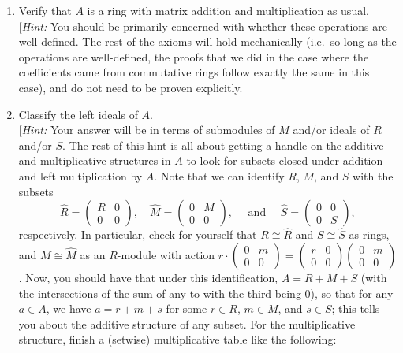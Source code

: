 \documentclass[11pt, reqno]{amsart}
\theoremstyle{plain}
\theoremstyle{definition}
\theoremstyle{example}
\begin{document}
\begin{enumerate}[1.]
\begin{enumerate}
\begin{enumerate}
\item Verify that $A$ is a ring with matrix addition and multiplication as usual. \\
{\small [\emph{Hint:} You should be primarily concerned with whether these operations are well-defined. The rest of the axioms will hold mechanically (i.e.\ so long as the operations are well-defined, the proofs that we did in the case where the coefficients came from commutative rings follow exactly the same in this case), and do not need to be proven explicitly.]}
\item Classify the left ideals of $A$. \\
{\small [\emph{Hint:} Your answer will be in terms of submodules of $M$ and/or ideals of $R$ and/or $S$. The rest of this hint is all about getting a handle on the additive and multiplicative structures in $A$ to look for subsets closed under addition and left multiplication by $A$. Note that we can identify $R$, $M$, and $S$ with the subsets 
$$\hat{R} =  \begin{pmatrix} R & 0 \\ 0 & 0 \end{pmatrix}, \quad \hat{M} = \begin{pmatrix} 0 & M \\ 0 & 0 \end{pmatrix}, \quad \text{ and } \quad 
	\hat{S} = \begin{pmatrix} 0 & 0 \\ 0 & S \end{pmatrix},$$
	respectively. In particular, check for yourself that $R \cong \hat{R}$ and $S \cong \hat{S}$ as rings, and $M \cong \hat{M}$ as an $R$-module with action 
	$r \cdot \begin{pmatrix} 0 & m \\ 0 & 0 \end{pmatrix} = \begin{pmatrix} r & 0 \\ 0 & 0 \end{pmatrix}\begin{pmatrix} 0 & m \\ 0 & 0 \end{pmatrix}$. Now, you should have that under this identification, $A = R + M  + S$ (with the intersections of the sum of any to with the third being 0), so that for any $a \in A$, we have $a = r + m + s$ for some $r \in R$, $m \in M$, and $s \in S$; this tells you about the additive structure of any subset. For the multiplicative structure, finish a (setwise) multiplicative table like the following:
}
\end{enumerate}
\end{enumerate}
\end{enumerate}
\end{document}

